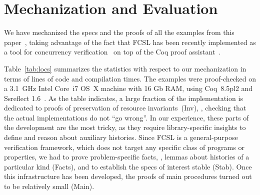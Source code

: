 \section{Mechanization and Evaluation}
\label{sec:evaluation}

%

We have mechanized the specs and the proofs of all the examples from
this paper~\cite{fcsl-site}, taking advantage of the fact that FCSL
has been recently implemented as a tool for concurrency
verification~\cite{Sergey-al:PLDI15} on top of the Coq proof
assistant~\cite{Coq-manual}.

Table~\ref{tab:locs} summarizes the statistics with respect to our
mechanization in terms of lines of code and compilation times. 
%
The examples were proof-checked on a 3.1~GHz Intel Core~i7 OS~X
machine with 16 Gb RAM, using Coq~8.5pl2 and Ssreflect
1.6~\cite{Gonthier-al:TR}.
%
As the table indicates, a large fraction of the implementation is
dedicated to proofs of preservation of resource
invariants~(\textsf{Inv}), \ie, checking that the actual
implementations do not ``go wrong''.
%
In our experience, these parts of the development are the most tricky,
as they require library-specific insights to define and reason about
auxiliary histories.
%
Since FCSL is a general-purpose verification framework, which does not
target any specific class of programs or properties, we had to prove
problem-specific facts, \eg, lemmas about histories of a particular
kind (\textsf{Facts}), and to establish the specs of interest stable
(\textsf{Stab}). Once this infrastructure has been developed, the
proofs of main procedures turned out to be relatively small
(\textsf{Main}).
%
%

